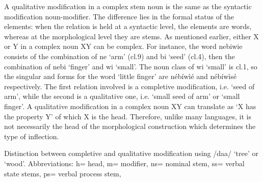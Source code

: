 \begin{exe}
\begin{exe}
\begin{exe}
\begin{exe}
\begin{exe}
\begin{exe}
A qualitative modification in a complex stem noun is the same as the  syntactic modification  noun-modifier. The difference lies in the formal status of the elements: when the relation is held at a syntactic level, the elements are words, whereas at the morphological level they are stems. As mentioned earlier,  either X or Y  in a complex noun XY can be complex. For instance, the word {\sls nebiwie} consists of the combination of {\sls ne}  `arm' ({\sc cl.9}) and {\sls bi} `seed' ({\sc cl.4}), then the combination of {\sls nebi} `finger' and {\sls wi} `small'. The noun class  of {\sls wi} `small'  is {\sc cl.1}, so the singular and  forms for the word `little finger' are {\sls nébíwìé} and  {\sls nébíwìsé} respectively. The first relation involved is a completive modification, i.e. `seed  of arm', while the second is a qualitative one, i.e. `small seed  of arm' or `small finger'.  A qualitative modification in a complex noun XY can translate as `X has the property Y'  of which X is the head. Therefore, unlike many languages,  it is not necessarily the head of the morphological construction which determines the type of inflection.

\begin{table}

\centering
\caption[Distinction between completive and qualitative
modification]{Distinction between completive and qualitative
modification using /daa/ `tree' or `wood'.  Abbreviations: {\sc h}= head,  {\sc
m}=
modifier, {\sc ns}= nominal stem, {\sc ss}= verbal state stems,  {\sc ps}=
verbal process stem, \label{tab:GRM-complet-and-qualit}}

\end{table}
\end{exe}
\end{exe}
\end{exe}
\end{exe}
\end{exe}
\end{exe}
